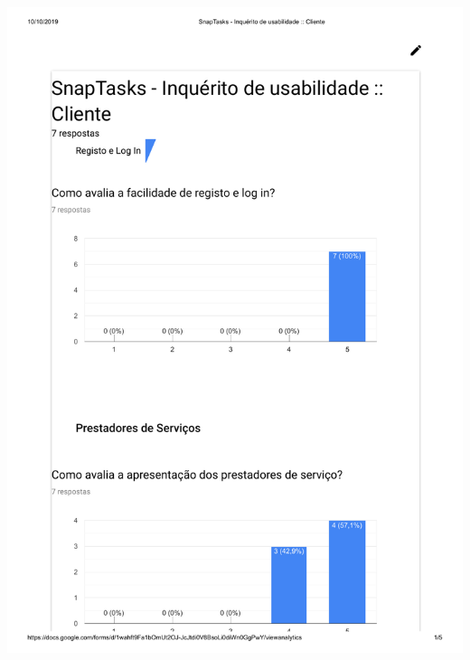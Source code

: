 \includegraphics[page=2,origin=c, width=\textwidth ]{appendices/files/InquiryCustomerAnswers.pdf}

\pagebreak

